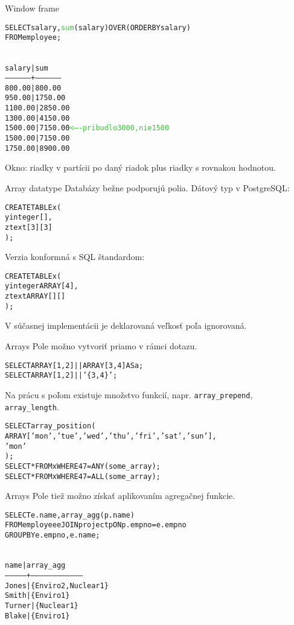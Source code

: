 \documentclass[12pt]{beamer}
\def\blue#1{\textcolor{Cerulean}{#1}}
\def\green#1{\textcolor{LimeGreen}{#1}}
\begin{document}
\begin{frame}[fragile]{Window frame}
\begin{alltt}
SELECT salary, \green{sum}(salary) \alert{OVER (ORDER BY salary)}
FROM employee;
\end{alltt}
{\scriptsize
\begin{alltt}
\blue{
 salary  |   sum
------------------+-----------------
  800.00 |   800.00
  950.00 |  1750.00
 1100.00 |  2850.00
 1300.00 |  4150.00
 1500.00 |  7150.00   \green{<---- pribudlo 3000, nie 1500}
 1500.00 |  7150.00
 1750.00 |  8900.00
}
\end{alltt}
}
Okno: riadky v partícii po daný riadok plus riadky s rovnakou hodnotou.
\end{frame}

\begin{frame}[fragile]{Array datatype}
Databázy bežne podporujú polia. Dátový typ v PostgreSQL:
\begin{alltt}
  CREATE TABLE x (
      y  integer[],
      z  text[3][3]
  );
\end{alltt}
Verzia konformná s SQL štandardom:
\begin{alltt}
  CREATE TABLE x (
      y  integer ARRAY[4],
      z  text ARRAY[][]
  );
\end{alltt}
V súčasnej implementácii je deklarovaná veľkosť poľa ignorovaná.
\end{frame}

\begin{frame}[fragile]{Arrays}
Pole možno vytvoriť priamo v rámci dotazu.
\begin{alltt}
SELECT ARRAY[1,2] || ARRAY[3,4] AS a;
SELECT ARRAY[1, 2] || '\{3, 4\}';
\end{alltt}
Na prácu s poľom existuje množstvo funkcií, napr. \verb|array_prepend|, \verb|array_length|.
\begin{alltt}
SELECT array_position(
    ARRAY['mon','tue','wed','thu','fri','sat','sun'],
    'mon'
  );
SELECT * FROM x WHERE 47 = ANY (some_array);
SELECT * FROM x WHERE 47 = ALL (some_array);
\end{alltt}
\end{frame}

\begin{frame}[fragile]{Arrays}
Pole tiež možno získať aplikovaním agregačnej funkcie.
\begin{alltt}
SELECT e.name, \alert{array_agg}(p.name)
FROM employee e JOIN project p ON p.empno = e.empno
GROUP BY e.empno, e.name;
\end{alltt}
\begin{alltt}
\blue{
  name  |     array_agg
---------------+-----------------------------------
 Jones  | \{Enviro2,Nuclear1\}
 Smith  | \{Enviro1\}
 Turner | \{Nuclear1\}
 Blake  | \{Enviro1\}
}
\end{alltt}
\end{frame}
\end{document}
